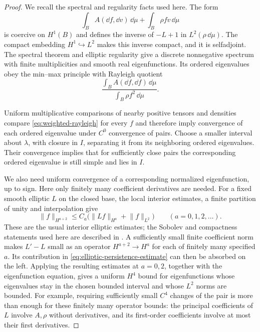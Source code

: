 \begin{proof}
We recall the spectral and regularity facts used here. The form
\[
 \int_B A(\dd f,\dd v)\,\dd\mu+
 \int_B\rho fv\,\dd\mu
\]
is coercive on $H^1(B)$ and defines the inverse of $-L+1$ in
$L^2(\rho\,\dd\mu)$. The compact embedding
$H^1\hookrightarrow L^2$ makes this inverse compact, and it is
selfadjoint. The spectral theorem and elliptic regularity give a
discrete nonnegative spectrum with finite multiplicities and smooth
real eigenfunctions. Its ordered eigenvalues obey the min--max
principle with Rayleigh quotient
\begin{equation}\label{eq:weighted-rayleigh}
 \frac{\int_B A(\dd f,\dd f)\,\dd\mu}
      {\int_B\rho f^2\,\dd\mu}.
\end{equation}

Uniform multiplicative comparisons of nearby positive tensors and
densities compare \eqref{eq:weighted-rayleigh} for every $f$ and
therefore imply convergence of each ordered eigenvalue under
$C^0$ convergence of pairs. Choose a smaller interval about
$\lambda$, with closure in $I$, separating it from its neighboring
ordered eigenvalues. Their convergence implies that for sufficiently
close pairs the corresponding ordered eigenvalue is still simple
and lies in $I$.

We also need uniform convergence of a corresponding normalized
eigenfunction, up to sign. Here only finitely many coefficient
derivatives are needed. For a fixed smooth elliptic $L$ on the
closed base, the local interior estimates, a finite partition of
unity and interpolation give
\begin{equation}\label{eq:elliptic-persistence-estimate}
 \lVert f\rVert_{H^{a+2}}
 \le C_a\bigl(\lVert Lf\rVert_{H^a}+\lVert f\rVert_{L^2}\bigr)
 \qquad(a=0,1,2,\ldots).
\end{equation}
These are the usual interior elliptic estimates; the Sobolev and
compactness statements used here are described in
\cite[Sections~5.6--5.7 and~6.3]{Evans2010}. A sufficiently small
finite coefficient norm makes $L'-L$ small as an operator
$H^{a+2}\to H^a$ for each of finitely many specified $a$. Its
contribution in \eqref{eq:elliptic-persistence-estimate} can then
be absorbed on the left. Applying the resulting estimates at
$a=0,2$, together with the eigenfunction equation, gives a uniform
$H^4$ bound for eigenfunctions whose eigenvalues stay in the
chosen bounded interval and whose $L^2$ norms are bounded.
For example, requiring sufficiently small $C^4$ changes of the
pair is more than enough for these finitely many operator bounds:
the principal coefficients of $L$ involve $A,\rho$ without
derivatives, and its first-order coefficients involve at most
their first derivatives.


\end{proof}
